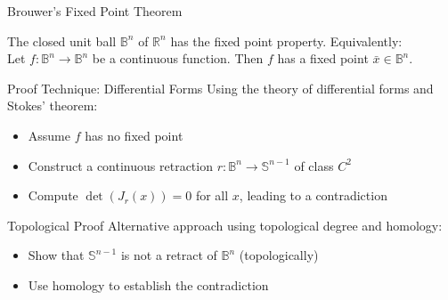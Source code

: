 \documentclass[aspectratio=169,10pt]{beamer}
\begin{document}
\begin{frame}[allowframebreaks]{Brouwer's Fixed Point Theorem}
    \begin{theorem}
        The closed unit ball $\mathbb{B}^n$ of $\mathbb{R}^n$ has the fixed point property. Equivalently: \\
        Let $f: \mathbb{B}^n \to \mathbb{B}^n$ be a continuous function. Then $f$ has a fixed point $\bar{x} \in \mathbb{B}^n$.
    \end{theorem}

    \begin{block}{Proof Technique: Differential Forms}
        Using the theory of differential forms and Stokes' theorem:
        \begin{itemize}
            \item Assume $f$ has no fixed point
            \item Construct a continuous retraction $r: \mathbb{B}^n \to \mathbb{S}^{n-1}$ of class $C^2$
            \item Compute $\det(J_r(x)) = 0$ for all $x$, leading to a contradiction
        \end{itemize}
    \end{block}

    \begin{block}{Topological Proof}
        Alternative approach using topological degree and homology:
        \begin{itemize}
            \item Show that $\mathbb{S}^{n-1}$ is not a retract of $\mathbb{B}^n$ (topologically)
            \item Use homology to establish the contradiction
        \end{itemize}
    \end{block}
\end{frame}
\end{document}
